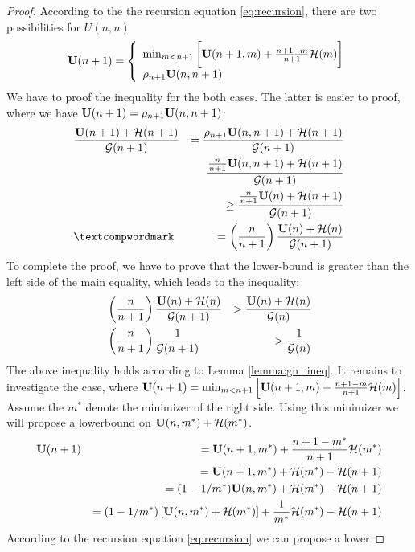 \begin{proof}
	According to the the recursion equation \ref{eq:recursion}, there are two
	possibilities for $U(n,n)$
	\begin{equation*} 
	\mathbf U(n+1) = 
\left\{
	\begin{array}{ll}
		\min_{m < n+1} \bigg[\mathbf U(n+1,m) + \frac{n+1 - m}{n+1}
		{\cal H}(m) \bigg]\\
		\rho_{n+1} \mathbf U(n,n+1)
	\end{array}
\right.
\end{equation*}
We have to proof the inequality for the both cases. The latter is easier to
proof, where we have $\mathbf U(n+1) = \rho_{n+1} \mathbf U(n,n+1)$: 
\begin{eqnarray*}
	& \frac{\U(n+1)+\bound(n+1)}{\G(n+1)} &  = 
	\frac{\rho_{n+1} \U(n,n+1)+\bound(n+1)}{\G(n+1)}  \\
	& & \frac{\frac{n}{n+1} \U(n,n+1)+\bound(n+1)}{\G(n+1)} \\ 
	& & \geq  \frac{\frac{n}{n+1} \U(n)+\bound(n+1)}{\G(n+1)} \\
	&‌ & = \left( \frac{n}{n+1}\right) \frac{\U(n)+\bound(n)}{\G(n+1)}
\end{eqnarray*}
To complete the proof, we have to prove that the
lower-bound is greater than the left side of the main equality, which leads to
the inequality:
\begin{eqnarray*}
	& \left( \frac{n}{n+1}\right) \frac{\mathbf U(n)+{\cal H}(n)}{{\cal G}(n+1)} & > 
	\frac{\mathbf U(n)+{\cal H}(n)}{{\cal G}(n)} \\
	& \left( \frac{n}{n+1}\right) \frac{1}{{\cal G}(n+1)} & > 
	\frac{1}{{\cal G}(n)}
\end{eqnarray*}
The above inequality holds according to Lemma \ref{lemma:gn_ineq}. It remains to
investigate the case, where $\mathbf U(n+1) = \min_{m < n+1} \left[\mathbf U(n+1,m) +
\frac{n+1 - m}{n+1} {\cal H}(m) \right]$. Assume the $m^*$ denote the minimizer of the right side.
Using this minimizer we will propose a lowerbound on $\mathbf U(n,m^*) + {\cal H}(m^*)$.
\begin{eqnarray*}
	& \mathbf U(n+1) & = \mathbf U(n+1,m^*) + \frac{n+1 - m^*}{n+1}
		{\cal H}(m^*) \\ 
		&  & = \mathbf U(n+1,m^*) + {\cal H}(m^*) - {\cal H}(n+1) \\ 
		& & = (1-1/m^*) \mathbf U(n,m^*) + {\cal H}(m^*) - {\cal H}(n+1) \\ 
		& & = (1-1/m^*) \left[ \mathbf U(n,m^*) + {\cal H}(m^*) \right] +
		\frac{1}{m^*} {\cal H}(m^*) - {\cal H}(n+1)
\end{eqnarray*} 
According to the recursion equation \ref{eq:recursion} we can propose a lower

\end{proof}
